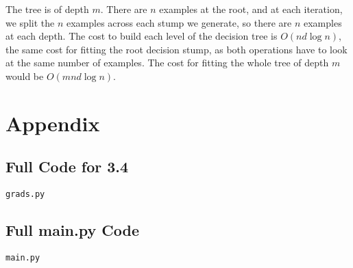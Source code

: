 \documentclass{article}
\def\gre#1{{\color{gre}#1}}
\begin{document}
\gre{The tree is of depth $m$. There are $n$ examples at the root, and at each iteration, we split the $n$ examples across each stump we generate, so there are $n$ examples at each depth. The cost to build each level of the decision tree is $O(nd\log n)$, the same cost for fitting the root decision stump, as both operations have to look at the same number of examples. The cost for fitting the whole tree of depth $m$ would be $O(mnd\log n)$.}

\section{Appendix}

\subsection[]{Full Code for 3.4}

\hypertarget{3.4}{\texttt{grads.py}}


\subsection[]{Full main.py Code}

\hypertarget{main.py}{\texttt{main.py}}

\end{document}
